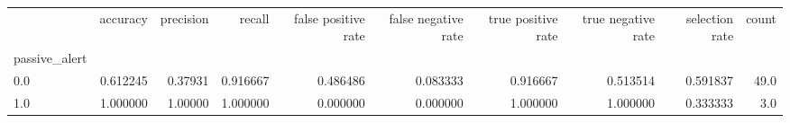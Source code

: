 \begin{tabular}{lrrrrrrrrr}
\toprule
{} &  accuracy &  precision &    recall &  false positive rate &  false negative rate &  true positive rate &  true negative rate &  selection rate &  count \\
passive\_alert &           &            &           &                      &                      &                     &                     &                 &        \\
\midrule
0.0           &  0.612245 &    0.37931 &  0.916667 &             0.486486 &             0.083333 &            0.916667 &            0.513514 &        0.591837 &   49.0 \\
1.0           &  1.000000 &    1.00000 &  1.000000 &             0.000000 &             0.000000 &            1.000000 &            1.000000 &        0.333333 &    3.0 \\
\bottomrule
\end{tabular}
